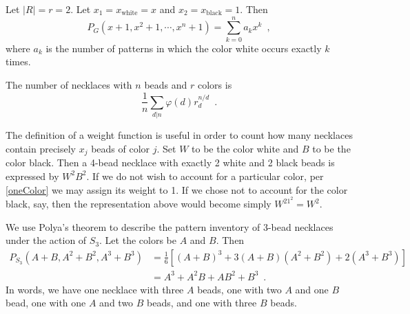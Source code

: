 \begin{corollary}
	\label{oneColor}
	\cite[89]{Aigner2007}
	Let $|R| = r = 2$. Let $x_1 = x_{\text{white}} = x$ and
	$x_2 = x_{\text{black}} = 1$. Then
	\begin{equation}
		P_G(x + 1, x^2 + 1, \cdots, x^n + 1) = \sum_{k = 0}^n a_k x^k \enspace,
	\end{equation}
	where $a_k$ is the number of patterns in which the color white occurs exactly $k$ times.
\end{corollary}

\begin{example}
	\cite[89]{Aigner2007}
	The number of necklaces with $n$ beads and $r$ colors is
	\begin{equation}
		\frac{1}{n} \sum_{d | n} \varphi(d) r_d^{n / d} \enspace.
	\end{equation}
\end{example}

\begin{example}
	\cite[86]{Aigner2007}
	The definition of a weight function is useful in order to count how many necklaces
	contain precisely $x_j$ beads of color $j$. Set $W$ to be the color white and $B$
	to be the color black. Then a 4-bead necklace with exactly 2 white and 2 black beads
	is expressed by $W^2B^2$. If we do not wish to account for a particular color,
	per \ref{oneColor} we may assign its weight to 1. If we chose not to account for the color
	black, say, then the representation above would become simply $W^21^2 = W^2$.
\end{example}

\begin{example}
	We use Polya's theorem to describe the pattern inventory of 3-bead necklaces under
	the action of $S_3$. Let the colors be $A$ and $B$. Then
		\begin{align}
			P_{S_3}(A + B, A^2 + B^2, A^3 + B^3)
			& = \frac{1}{6}[(A + B)^3 + 3 (A + B) (A^2 + B^2) + 2 (A^3 + B^3)] \\
			& = A^3 + A^2 B + A B^2 + B^3 \enspace.
		\end{align}
	In words, we have one necklace with three $A$ beads, one with two $A$ and one $B$ bead,
	one with one $A$ and two $B$ beads, and one with three $B$ beads.
\end{example}

